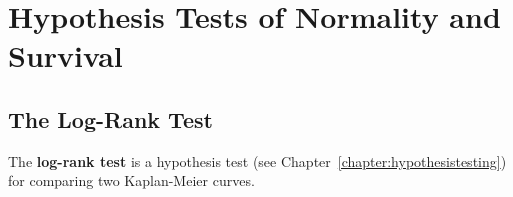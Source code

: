 \chapter{Hypothesis Tests of Normality and Survival \label{chapter:hypothesisii}}


\section{The Log-Rank Test}

The \textbf{log-rank test} is a hypothesis test (see Chapter~\ref{chapter:hypothesistesting}) for comparing two Kaplan-Meier curves. 